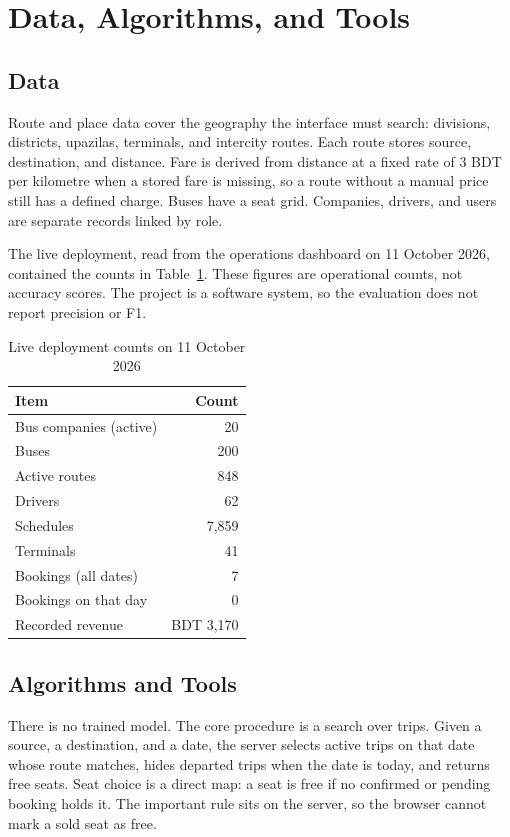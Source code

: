 \documentclass[12pt,a4paper]{report}
\begin{document}
\section{Data, Algorithms, and Tools}
\subsection{Data}
Route and place data cover the geography the interface must search: divisions, districts, upazilas, terminals, and intercity routes. Each route stores source, destination, and distance. Fare is derived from distance at a fixed rate of 3 BDT per kilometre when a stored fare is missing, so a route without a manual price still has a defined charge. Buses have a seat grid. Companies, drivers, and users are separate records linked by role.

The live deployment, read from the operations dashboard on 11 October 2026, contained the counts in Table~\ref{tab:live}. These figures are operational counts, not accuracy scores. The project is a software system, so the evaluation does not report precision or F1.

\begin{table}[ht]
\centering
\caption{Live deployment counts on 11 October 2026}
\label{tab:live}
\renewcommand{\arraystretch}{1.25}
\setlength{\arrayrulewidth}{0.6pt}
\begin{tabular}{|l|r|}
\hline
\textbf{Item} & \textbf{Count} \\
\hline
Bus companies (active) & 20 \\
\hline
Buses & 200 \\
\hline
Active routes & 848 \\
\hline
Drivers & 62 \\
\hline
Schedules & 7{,}859 \\
\hline
Terminals & 41 \\
\hline
Bookings (all dates) & 7 \\
\hline
Bookings on that day & 0 \\
\hline
Recorded revenue & BDT 3{,}170 \\
\hline
\end{tabular}
\end{table}

\subsection{Algorithms and Tools}
There is no trained model. The core procedure is a search over trips. Given a source, a destination, and a date, the server selects active trips on that date whose route matches, hides departed trips when the date is today, and returns free seats. Seat choice is a direct map: a seat is free if no confirmed or pending booking holds it. The important rule sits on the server, so the browser cannot mark a sold seat as free.
\end{document}

